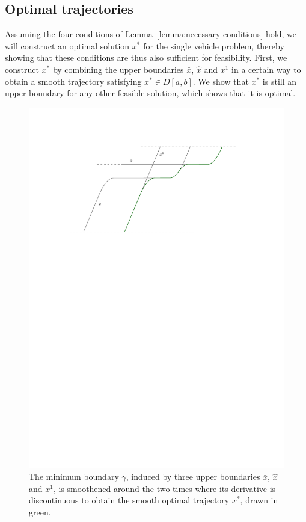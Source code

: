 \documentclass[a4paper]{article}
\theoremstyle{definition}
\theoremstyle{plain}
\begin{document}
\pagebreak

\subsection{Optimal trajectories}

Assuming the four conditions of Lemma~\ref{lemma:necessary-conditions} hold, we will construct an optimal
solution $x^{*}$ for the single vehicle problem, thereby showing that these
conditions are thus also sufficient for feasibility.
%
First, we construct $x^{*}$ by combining the upper boundaries $\bar{x}$,
$\hat{x}$ and $x^{1}$ in a certain way to obtain a smooth trajectory satisfying
$x^{*} \in D[a,b]$.
%
We show that $x^{*}$ is still an upper boundary for any other feasible solution,
which shows that it is optimal.

\begin{figure}
  \centering
  \includegraphics[scale=1]{figures/motion/rough/proof}
  \caption{The minimum boundary $\gamma$, induced by three upper boundaries
    $\bar{x}$, $\hat{x}$ and $x^{1}$, is smoothened around the two times where
    its derivative is discontinuous to obtain the smooth optimal trajectory
    $x^{*}$, drawn in green.}%
  \label{fig:optimal-construction}
\end{figure}
\end{document}
